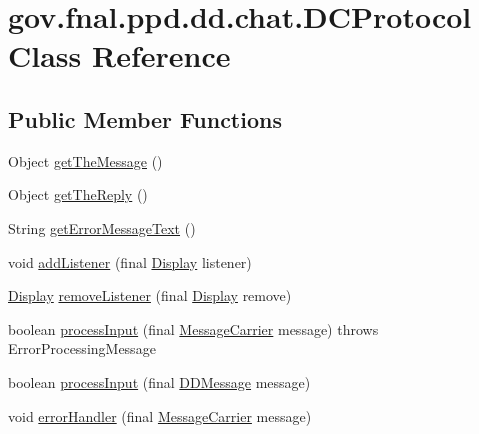 \hypertarget{classgov_1_1fnal_1_1ppd_1_1dd_1_1chat_1_1DCProtocol}{\section{gov.\-fnal.\-ppd.\-dd.\-chat.\-D\-C\-Protocol Class Reference}
\label{classgov_1_1fnal_1_1ppd_1_1dd_1_1chat_1_1DCProtocol}
}
\subsection*{Public Member Functions}
\begin{DoxyCompactItemize}
\item 
Object \hyperlink{classgov_1_1fnal_1_1ppd_1_1dd_1_1chat_1_1DCProtocol_acf8d08aca9eae3e66e1adf7dc1bc5d82}{get\-The\-Message} ()
\item 
Object \hyperlink{classgov_1_1fnal_1_1ppd_1_1dd_1_1chat_1_1DCProtocol_a17f34e0e46490a5296f36c383e057183}{get\-The\-Reply} ()
\item 
String \hyperlink{classgov_1_1fnal_1_1ppd_1_1dd_1_1chat_1_1DCProtocol_ac722cf203ee54e89313dba3fb6fb5a0d}{get\-Error\-Message\-Text} ()
\item 
void \hyperlink{classgov_1_1fnal_1_1ppd_1_1dd_1_1chat_1_1DCProtocol_a2557f193a252b6bd8c88216df32a0c1d}{add\-Listener} (final \hyperlink{interfacegov_1_1fnal_1_1ppd_1_1dd_1_1signage_1_1Display}{Display} listener)
\item 
\hyperlink{interfacegov_1_1fnal_1_1ppd_1_1dd_1_1signage_1_1Display}{Display} \hyperlink{classgov_1_1fnal_1_1ppd_1_1dd_1_1chat_1_1DCProtocol_a50cc43db9fbfb5d00eb14c5ef4917b2f}{remove\-Listener} (final \hyperlink{interfacegov_1_1fnal_1_1ppd_1_1dd_1_1signage_1_1Display}{Display} remove)
\item 
boolean \hyperlink{classgov_1_1fnal_1_1ppd_1_1dd_1_1chat_1_1DCProtocol_a46f18eb53cbd9bfd5c66f949a75183ad}{process\-Input} (final \hyperlink{classgov_1_1fnal_1_1ppd_1_1dd_1_1chat_1_1MessageCarrier}{Message\-Carrier} message)  throws Error\-Processing\-Message 
\item 
boolean \hyperlink{classgov_1_1fnal_1_1ppd_1_1dd_1_1chat_1_1DCProtocol_ae04aafd01c0e11d840f5894a3f9adbab}{process\-Input} (final \hyperlink{classgov_1_1fnal_1_1ppd_1_1dd_1_1chat_1_1DDMessage}{D\-D\-Message} message)
\item 
void \hyperlink{classgov_1_1fnal_1_1ppd_1_1dd_1_1chat_1_1DCProtocol_adbe4b6c9410c77421a164ff2b02b1e31}{error\-Handler} (final \hyperlink{classgov_1_1fnal_1_1ppd_1_1dd_1_1chat_1_1MessageCarrier}{Message\-Carrier} message)
\end{DoxyCompactItemize}
